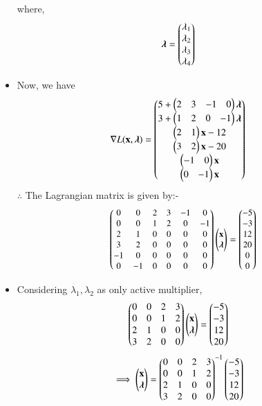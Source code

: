 \begin{itemize}
\begin{equation}
\end{equation}
where,
\begin{align}
    \boldsymbol{\lambda} &= \begin{pmatrix}\lambda_1 \\ \lambda_2 \\ \lambda_3 \\ \lambda_4\end{pmatrix}
\end{align}
\item Now, we have
\begin{align}
    \nabla L(\mathbf{x},\boldsymbol{\lambda}) &= \begin{pmatrix}5 + \begin{pmatrix}2 & 3 & -1 & 0 \end{pmatrix}\boldsymbol{\lambda}\\ 3 +\begin{pmatrix}1 & 2 &0 & -1\end{pmatrix}\boldsymbol{\lambda} \\ \begin{pmatrix}2 & 1\end{pmatrix}\mathbf{x}-12 \\ \begin{pmatrix}3 & 2\end{pmatrix}\mathbf{x}-20 \\ \begin{pmatrix}-1 & 0\end{pmatrix}\mathbf{x} \\ \begin{pmatrix}0 & -1\end{pmatrix}\mathbf{x}\end{pmatrix}
\end{align}
$\therefore$ The Lagrangian matrix is given by:-
\begin{align}
  \small{\ensuremath{\begin{pmatrix}0 & 0 & 2 & 3 & -1 & 0 \\ 0 & 0 & 1 & 2 &0 & -1 \\ 2 & 1 & 0 & 0 & 0 & 0 \\ 3 & 2 & 0 & 0 & 0 & 0 \\ -1 & 0 & 0 & 0 & 0 & 0 \\ 0 & -1 & 0 & 0 & 0 & 0 \end{pmatrix}}\ensuremath{\begin{pmatrix}\mathbf{x} \\ \boldsymbol{\lambda} \end{pmatrix}}}= \small{\ensuremath{\begin{pmatrix}-5 \\ -3 \\ 12 \\ 20 \\ 0 \\0 \end{pmatrix}}}
\end{align}
\item Considering $\lambda_1,\lambda_2$ as only active multiplier,
\begin{align}
    \begin{pmatrix}0 & 0 & 2 & 3  \\ 0 & 0 & 1 & 2 \\ 2 & 1 & 0 & 0 \\3 & 2 & 0 & 0\end{pmatrix}\begin{pmatrix}\mathbf{x}\\ \boldsymbol{\lambda}\end{pmatrix} &= \begin{pmatrix}-5 \\ -3 \\ 12 \\ 20\end{pmatrix}
\end{align}
\begin{align}
 \implies   \myvec{\vec{x} \\ \boldsymbol{\lambda}} &=  \myvec{0 & 0 & 2 & 3  \\ 0 & 0 & 1 & 2 \\ 2 & 1 & 0 & 0 \\3 & 2 & 0 & 0} ^{-1}\myvec{-5 \\ -3 \\ 12 \\ 20}

\end{align}
\end{itemize}
